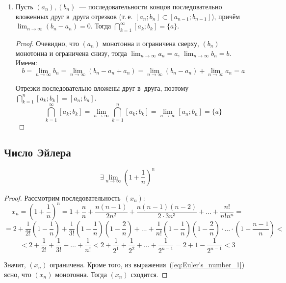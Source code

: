 \begin{enumerate}
	\item{} \begin{lemma}
	\label{lemma:about_nested_intervals}
	Пусть $(a_n), (b_n)$~--- последовательности концов последовательно вложенных друг в~друга отрезков (т.\,е. $[a_n; b_n] \subset [a_{n-1}; b_{n-1}]$), причём $\displaystyle \lim_{n \to \infty} (b_n - a_n) = 0$.
	Тогда $\displaystyle \bigcap_{k=1}^\infty [a_k; b_k] = \{ a \}$.
	\end{lemma}
	\begin{proof}
	Очевидно, что $(a_n)$ монотонна и ограничена сверху, $(b_n)$ монотонна и ограничена снизу, тогда $\displaystyle \lim_{n \to \infty} a_n = a$, $\displaystyle \lim_{n \to \infty} b_n = b$.
	Имеем:
	\begin{equation*}
	b = \lim_{n \to \infty} b_n = \lim_{n \to \infty} (b_n - a_n + a_n) = \lim_{n \to \infty} (b_n - a_n) + \lim_{n \to \infty} a_n = a
	\end{equation*}
	
	Отрезки последовательно вложены друг в~друга, поэтому $\displaystyle \bigcap_{k=1}^n [a_k; b_k] = [a_n; b_n]$.
	\begin{equation*}
	\bigcap_{k=1}^\infty [a_k; b_k] = \lim_{n \to \infty} \bigcap_{k=1}^n [a_k; b_k] = \lim_{n \to \infty} [a_n; b_n] = \{ a \}
	\end{equation*}
	\end{proof}
\end{enumerate}

\subsection{Число Эйлера}
\begin{statement}
\begin{equation*}
\exists \lim_{n \to \infty} \left( 1 + \frac1n \right)^n
\end{equation*}
\end{statement}
\begin{proof}
Рассмотрим последовательность~$(x_n) \colon$
\begin{equation*}
x_n = \left( 1 + \frac1n \right)^n = 1 + \frac{n}n + \frac{n(n - 1)}{2n^2} + \frac{n(n - 1)(n - 2)}{2 \cdot 3n^3} + \ldots + \frac{n!}{n!n^n} =
\end{equation*}
\begin{equation}
\label{eq:Euler's_number_1}
= 2 + \frac1{2!} \left( 1 - \frac1n \right) + \frac1{3!} \left( 1 - \frac1n \right) \left( 1 - \frac2n \right) + \ldots + \frac1{n!} \left( 1 - \frac1n \right) \left( 1 - \frac2n \right) \cdot \ldots \cdot \left( 1 - \frac{n - 1}n \right) <
\end{equation}
\begin{equation*}
< 2 + \frac1{2!} + \frac1{3!} + \ldots + \frac1{n!} < 2 + \frac1{2^1} + \frac1{2^2} + \ldots + \frac1{2^{n-1}} = 2 + 1 - \frac1{2^{n-1}} < 3
\end{equation*}

Значит, $(x_n)$ ограничена.
Кроме того, из выражения~(\ref*{eq:Euler's_number_1}) ясно, что $(x_n)$ монотонна.
Тогда $(x_n)$ сходится.
\end{proof}

